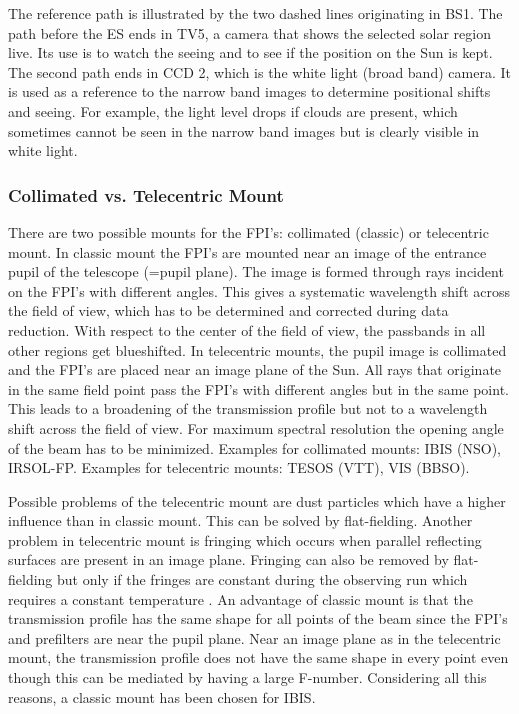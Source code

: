 \documentclass[a4paper,11pt]{article}
\begin{document}
The reference path is illustrated by the two dashed lines originating in BS1. The path before the ES ends in TV5, a camera that shows the selected solar region live. Its use is to watch the seeing and to see if the position on the Sun is kept. The second path ends in CCD 2, which is the white light (broad band) camera. It is used as a reference to the narrow band images to determine positional shifts and seeing. For example, the light level drops if clouds are present, which sometimes cannot be seen in the narrow band images but is clearly visible in white light.

\subsubsection{Collimated vs. Telecentric Mount}
There are two possible mounts for the FPI's: collimated (classic) or telecentric mount. In classic mount the FPI's are mounted near an image of the entrance pupil of the telescope (=pupil plane). The image is formed through rays incident on the FPI's with different angles. This gives a systematic wavelength shift across the field of view, which has to be determined and corrected during data reduction. With respect to the center of the field of view, the passbands in all other regions get blueshifted. In telecentric mounts, the pupil image is collimated and the FPI's are placed near an image plane of the Sun. All rays that originate in the same field point pass the FPI's with different angles but in the same point. This leads to a broadening of the transmission profile but not to a wavelength shift across the field of view. For maximum spectral resolution the opening angle of the beam has to be minimized. Examples for collimated mounts: IBIS (NSO), IRSOL-FP. Examples for telecentric mounts: TESOS (VTT), VIS (BBSO).

Possible problems of the telecentric mount are dust particles which have a higher influence than in classic mount. This can be solved by flat-fielding. Another problem in telecentric mount is fringing which occurs when parallel reflecting surfaces are present in an image plane. Fringing can also be removed by flat-fielding but only if the fringes are constant during the observing run which requires a constant temperature \cite{cavallini2006}. An advantage of classic mount is that the transmission profile has the same shape for all points of the beam since the FPI's and prefilters are near the pupil plane. Near an image plane as in the telecentric mount, the transmission profile does not have the same shape in every point even though this can be mediated by having a large F-number. Considering all this reasons, a classic mount has been chosen for IBIS.
\end{document}
